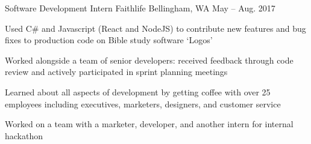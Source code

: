 

\begin{cventries}

  \cventry
    {Software Development Intern} %
    {Faithlife} %
    {Bellingham, WA} %
    {May – Aug. 2017} %
    {
      \begin{cvitems} %
        \item {Used C\# and Javascript (React and NodeJS) to contribute new features and bug fixes to production code on Bible study software `Logos'}
        \item {Worked alongside a team of senior developers: received feedback through code review and actively participated in sprint planning meetings}
        \item {Learned about all aspects of development by getting coffee with over 25 employees including executives, marketers, designers, and customer service}
        \item {Worked on a team with a marketer, developer, and another intern for internal hackathon}
      \end{cvitems}
    }

\end{cventries}
